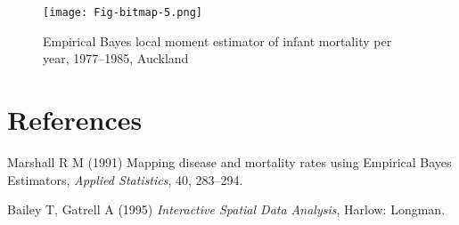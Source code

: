 \documentclass[a4paper,10pt]{article}
\begin{document}
\begin{figure}[htbp]
\begin{center} 
\texttt{[image: Fig-bitmap-5.png]}\end{center}
\caption{Empirical Bayes local moment estimator of infant mortality per year, 1977--1985, Auckland}
\label{EBloc}
\end{figure}

\section*{References}

\begin{description}

\item Marshall R M (1991) Mapping disease and mortality rates using
Empirical Bayes Estimators, \emph{Applied Statistics}, 40, 283--294.

\item Bailey T, Gatrell A (1995) \emph{Interactive Spatial Data Analysis},
Harlow: Longman.

\end{description}
\end{document}
